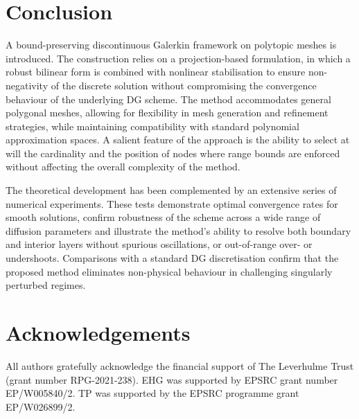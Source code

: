 \documentclass[11pt,final]{amsart}
\theoremstyle{plain}
\theoremstyle{definition}
\begin{document}
\section{Conclusion}\label{sec:conclusion}

A bound-preserving discontinuous
Galerkin framework on polytopic meshes is introduced. The construction relies on a
projection-based formulation, in which a robust bilinear form is
combined with nonlinear stabilisation to ensure non-negativity of the
discrete solution without compromising the convergence behaviour of
the underlying DG scheme. The method accommodates general polygonal
meshes, allowing for flexibility in mesh generation and refinement
strategies, while maintaining compatibility with standard polynomial
approximation spaces. A salient feature of the approach is the ability to select at will the cardinality and the position of nodes where range bounds are enforced without affecting the overall complexity of the method.

The theoretical development has been complemented by an extensive
series of numerical experiments. These tests demonstrate optimal
convergence rates for smooth solutions, confirm robustness of the
scheme across a wide range of diffusion parameters and illustrate the
method's ability to resolve both boundary and interior layers without
spurious oscillations, or out-of-range over- or undershoots. Comparisons with a standard DG discretisation
confirm that the proposed method eliminates non-physical behaviour
in challenging singularly perturbed regimes.

\section*{Acknowledgements}

All authors gratefully acknowledge the financial support of The
Leverhulme Trust (grant number RPG-2021-238).  EHG was supported by
EPSRC grant number EP/W005840/2.  TP was supported by the EPSRC
programme grant EP/W026899/2.



\end{document}
